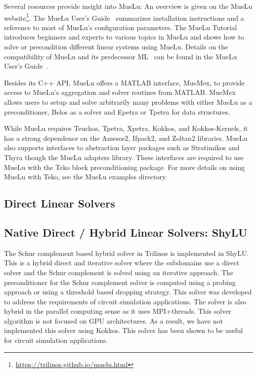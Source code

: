 Several resources provide insight into MueLu:
An overview is given on the MueLu website\footnote{\url{https://trilinos.github.io/muelu.html}}.
The MueLu User's Guide~\cite{BergerVergiat2023a} summarizes installation instructions and a reference to most of MueLu's configuration parameters.
The MueLu Tutorial~\cite{Mayr2023b} introduces beginners and experts to various topics in MueLu and shows how to solve or precondition different linear systems using MueLu.
Details on the compatibility of MueLu and its predecessor ML~\cite{Heroux2005a,Gee2006a} can be found in the MueLu User's Guide~\cite{BergerVergiat2023a}.

Besides its C++ API, MueLu offers a MATLAB interface, MueMex, to provide access to MueLu's aggregation and solver routines from MATLAB.
MueMex allows users to setup and solve arbitrarily many problems with either MueLu as a preconditioner, Belos as a solver and Epetra or Tpetra for data structures.

While MueLu requires Teuchos, Tpetra, Xpetra, Kokkos, and Kokkos-Kernels, it has a strong dependence 
on the Amesos2, Ifpack2, and Zoltan2 libraries.
MueLu also supports interfaces to abstraction layer packages such as Stratimikos and Thyra though the MueLu adapters library.
These interfaces are required to use MueLu with the Teko block preconditioning package.
For more details on using MueLu with Teko, see the MueLu examples directory.


\subsection{Direct Linear Solvers}


\subsection{Native Direct / Hybrid Linear Solvers: ShyLU}
 The Schur complement based hybrid solver in Trilinos is implemented in ShyLU. This is a hybrid direct and iterative solver where the subdomains use a direct solver and the Schur complement is solved using an iterative approach. The preconditioner for the Schur complement solver is computed using a probing approach or using a threshold based dropping strategy. This solver was developed to address the requirements of circuit simulation applications. The solver is also hybrid in the parallel computing sense as it uses MPI+threads. This  solver algorithm is not focused on GPU architectures. As a result, we have not implemented this solver using Kokkos. This solver has been shown to be useful for circuit simulation applications.

